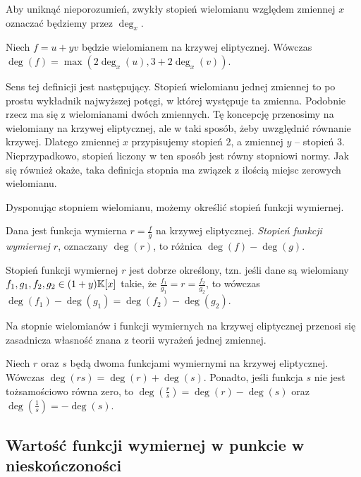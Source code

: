 \begin{remark}
Aby uniknąć nieporozumień,
zwykły stopień wielomianu względem zmiennej $x$
oznaczać będziemy przez $\deg_x$.
\end{remark}

\begin{fact}
Niech $f = u + yv$ będzie wielomianem na krzywej eliptycznej.
Wówczas $\deg(f) = \max(2\deg_x(u), 3 + 2\deg_x(v))$.
\end{fact}

Sens tej definicji jest następujący. Stopień wielomianu jednej zmiennej
to po prostu wykładnik najwyższej potęgi, w której występuje ta zmienna.
Podobnie rzecz ma się z wielomianami dwóch zmiennych.
Tę koncepcję przenosimy na wielomiany na krzywej eliptycznej,
ale w taki sposób, żeby uwzględnić równanie krzywej.
Dlatego zmiennej $x$ przypisujemy stopień $2$,
a zmiennej $y$ -- stopień $3$.
Nieprzypadkowo, stopień liczony w ten sposób
jest równy stopniowi normy.
Jak się również okaże,
taka definicja stopnia ma związek z ilością miejsc zerowych wielomianu.

Dysponując stopniem wielomianu, możemy określić stopień funkcji wymiernej.

\begin{definition}
Dana jest funkcja wymierna $r = \frac{f}{g}$ na krzywej eliptycznej.
\emph{Stopień funkcji wymiernej $r$},
oznaczany $\deg(r)$,
to różnica $\deg(f) - \deg(g)$.
\end{definition}

\begin{theorem}
Stopień funkcji wymiernej $r$ jest dobrze określony,
tzn. jeśli dane są wielomiany $f_1, g_1, f_2, g_2 \in (1 + y)\mathbb{K}[x]$
takie, że $\frac{f_1}{g_1} = r = \frac{f_2}{g_2}$,
to wówczas $\deg(f_1) - \deg(g_1) = \deg(f_2) - \deg(g_2)$.
\end{theorem}

Na stopnie wielomianów i funkcji wymiernych na krzywej eliptycznej
przenosi się zasadnicza własność znana z teorii wyrażeń jednej zmiennej.

\begin{theorem}
Niech $r$ oraz $s$ będą dwoma funkcjami wymiernymi na krzywej eliptycznej.
Wówczas $\deg(rs) = \deg(r) + \deg(s)$.
Ponadto, jeśli funkcja $s$ nie jest tożsamościowo równa zero,
to $\deg(\frac{r}{s}) = \deg(r) - \deg(s)$ oraz $\deg(\frac{1}{s}) = -\deg(s)$.
\end{theorem}

\subsection*{Wartość funkcji wymiernej w punkcie w nieskończoności}

